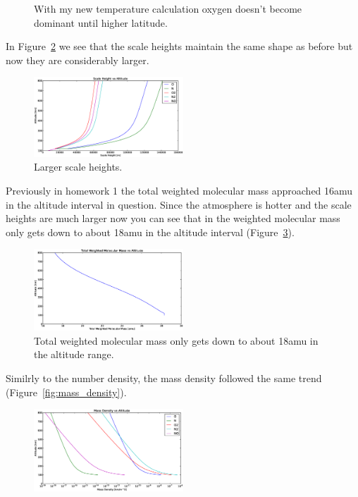 \documentclass[10pt]{article}
\begin{document}
\begin{multicols}{2}
\begin{figure}[H]
	\caption{With my new temperature calculation oxygen doesn't become dominant until higher latitude.}
	\label{fig:O_N}
\end{figure}
In Figure~\ref{fig:scale_height} we see that the scale heights maintain the same shape as before but now they are considerably larger. 
\begin{figure}[H]
	\centering
		\includegraphics[width=0.5\textwidth]{./Figures/Scale_Height_vs_Altitude.eps}
	\caption{Larger scale heights.}
	\label{fig:scale_height}
\end{figure}
Previously in homework 1 the total weighted molecular mass approached 16amu in the altitude interval in question. Since the atmosphere is hotter and the scale heights are much larger now you can see that in the weighted molecular mass only gets down to about 18amu in the altitude interval (Figure~\ref{fig:molecular_mass}).
\begin{figure}[H]
	\centering
		\includegraphics[width=0.5\textwidth]{./Figures/Total_Weighted_Molecular_Mass_vs_Altitude.eps}
	\caption{Total weighted molecular mass only gets down to about 18amu in the altitude range.}
	\label{fig:molecular_mass}
\end{figure}
Similrly to the number density, the mass density followed the same trend (Figure~\ref{fig:mass_density}).
\begin{figure}[H]
	\centering
		\includegraphics[width=0.5\textwidth]{./Figures/Mass_Density_vs_Altitude.eps}

\end{figure}
\end{multicols}
\end{document}
